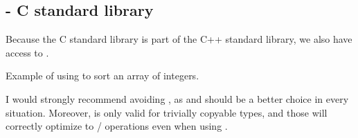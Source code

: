 \subsection{\texorpdfstring{}{\texttt{qsort}} - C standard library}

Because the C standard library is part of the C++ standard library, we also have access to .

\begin{box-note}
\footnotesize Example of using  to sort an array of integers.
\tcblower
{}
\end{box-note}

I would strongly recommend avoiding , as  and  should be a better choice in every situation. Moreover,  is only valid for trivially copyable types, and those will correctly optimize to / operations even when using .

